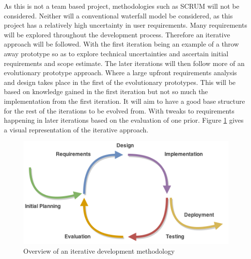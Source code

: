 \documentclass[11pt,oneside]{report}
\begin{document}
					As this is not a team based project, methodologies such as SCRUM will not be considered.
					Neither will a conventional waterfall model be considered, as this project has a relatively high uncertainty in user requirements.
					Many requirements will be explored throughout the development process.
					Therefore an iterative approach will be followed.
					With the first iteration being an example of a throw away prototype so as to explore technical uncertainties and ascertain initial requirements and scope estimate.
					The later iterations will then follow more of an evolutionary prototype approach.
					Where a large upfront requirements analysis and design takes place in the first of the evolutionary prototypes.
					This will be based on knowledge gained in the first iteration but not so much the implementation from the first iteration.
					It will aim to have a good base structure for the rest of the iterations to be evolved from.
					With tweaks to requirements happening in later iterations based on the evaluation of one prior.
					Figure \ref{fig:iterative} gives a visual representation of the iterative approach.
					\begin{figure}[!h]
						\centering
					
    						\includegraphics[width=\textwidth]{iterative_development}
    						\caption{Overview of an iterative development methodology {\label{fig:iterative}}}
					\end{figure}
\end{document}
